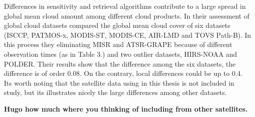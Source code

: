Differences in sensitivity and retrieval algorithms contribute to a large spread in global mean cloud amount among different cloud products. In their assessment of global cloud datasets \cite{Stubenrauch2013AssessmentPanel} compared the global mean cloud cover of six datasets (ISCCP, PATMOS-x, MODIS-ST, MODIS-CE, AIR-LMD and TOVS Path-B). In this process they eliminating MISR and ATSR-GRAPE because of different observation times (as in Table 3.) and two outlier datasets, HIRS-NOAA and POLDER. Their results show that the difference among the six datasets, the difference is of order 0.08. On the contrary, local differences could be up to 0.4. Its worth noting that the satellite data using in this thesis is not included in  \citeauthor{Stubenrauch2013AssessmentPanel} study, but its illustrates nicely the large differences among other datasets. 


\textbf{Hugo how much where you thinking of including from other satellites.}

